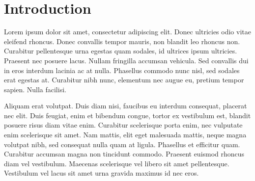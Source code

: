
\section{Introduction} \label{sec:intro}


Lorem ipsum dolor sit amet, consectetur adipiscing elit. Donec ultricies odio vitae eleifend rhoncus. Donec convallis tempor mauris, non blandit leo rhoncus non. Curabitur pellentesque urna egestas quam sodales, id ultrices ipsum ultricies. Praesent nec posuere lacus. Nullam fringilla accumsan vehicula. Sed convallis dui in eros interdum lacinia ac at nulla. Phasellus commodo nunc nisl, sed sodales erat egestas at. Curabitur nibh nunc, elementum nec augue eu, pretium tempor sapien. Nulla facilisi.

Aliquam erat volutpat. Duis diam nisi, faucibus eu interdum consequat, placerat nec elit. Duis feugiat, enim et bibendum congue, tortor ex vestibulum est, blandit posuere risus diam vitae enim. Curabitur scelerisque porta enim, nec vulputate enim scelerisque sit amet. Nam mattis, elit eget malesuada mattis, neque magna volutpat nibh, sed consequat nulla quam at ligula. Phasellus et efficitur quam. Curabitur accumsan magna non tincidunt commodo. Praesent euismod rhoncus diam vel vestibulum. Maecenas scelerisque vel libero sit amet pellentesque. Vestibulum vel lacus sit amet urna gravida maximus id nec eros.